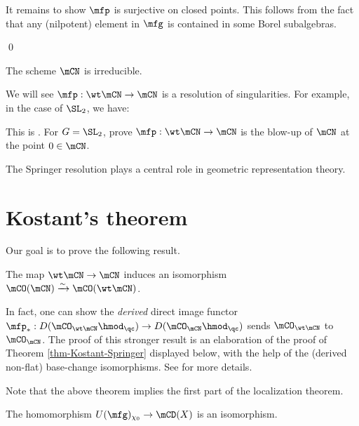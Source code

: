 		It remains to show $\mfp$ is surjective on closed points. This follows from the fact that any (nilpotent) element in $\mfg$ is contained in some Borel subalgebras.

	\qed

	\begin{cor}
		\label{cor-Nilp-irre}
		The scheme $\mCN$ is irreducible.
	\end{cor}

	We will see $\mfp: \wt\mCN \to \mCN$ is a resolution of singularities. For example, in the case of $\SL_2$, we have:

	\begin{exe}
		This is . For $G=\SL_2$, prove $\mfp: \wt\mCN \to \mCN$ is the blow-up of $\mCN$ at the point $0\in \mCN$.
	\end{exe}

	\begin{rem}
		The Springer resolution plays a central role in geometric representation theory.
	\end{rem}

\section{Kostant's theorem}

	Our goal is to prove the following result.

	\begin{thm}[Kostant]
		\label{thm-Kostant-Springer}
		The map $\wt\mCN \to \mCN$ induces an isomorphism $\mCO(\mCN) \xrightarrow{\sim} \mCO(\wt\mCN)$.
	\end{thm}

	\begin{rem}
		In fact, one can show the \emph{derived} direct image functor $\mfp_*:D(\mCO_{\wt\mCN}\hmod_\qc) \to D(\mCO_{\mCN}\hmod_\qc)$ sends $\mCO_{\wt\mCN}$ to $\mCO_{\mCN}$. The proof of this stronger result is an elaboration of the proof of Theorem \ref{thm-Kostant-Springer} displayed below, with the help of the (derived non-flat) base-change isomorphisms. See \cite[Section 7]{G} for more details.

	\end{rem}

	Note that the above theorem implies the first part of the localization theorem.

	\begin{cor}
		\label{cor-U-vs-D}
		The homomorphism $U(\mfg)_{\chi_0} \to \mCD(X)$ is an isomorphism.
	\end{cor}

